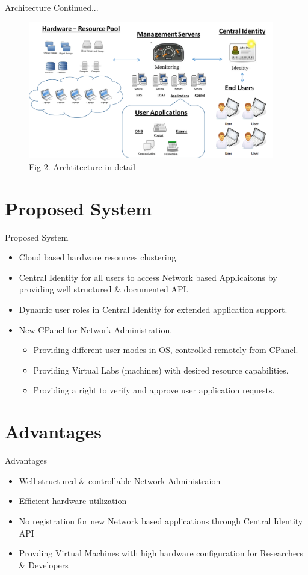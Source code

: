 \documentclass[xcolor=dvipsnames]{beamer}
\begin{document}
\begin{frame}{Architecture Continued...}
\begin{figure}[H]
 \includegraphics[height=6cm]{./all.png} \\ 
 Fig 2. Archtitecture in detail
\end{figure}
\end{frame}

\section{Proposed System}
\begin{frame}{Proposed System}
\begin{itemize}
	\item Cloud based hardware resources clustering.
	\item Central Identity for all users to access Network based Applicaitons by providing well structured \& documented API.
	\item Dynamic user roles in Central Identity for extended application support.
	\item New CPanel for Network Administration.
		\begin{itemize}
			\item Providing different user modes in OS, controlled remotely from CPanel.
			\item Providing Virtual Labs (machines) with desired resource capabilities.
			\item Providing a right to verify and approve user application requests.
		\end{itemize}
\end{itemize}
\end{frame}

\section{Advantages}
\begin{frame}{Advantages}
\begin{itemize}
	\item Well structured \& controllable Network Administraion
	\item Efficient hardware utilization
	\item No registration for new Network based applications through Central Identity API
	\item Provding Virtual Machines with high hardware configuration for Researchers \& Developers
\end{itemize}
\end{frame}
\end{document}
